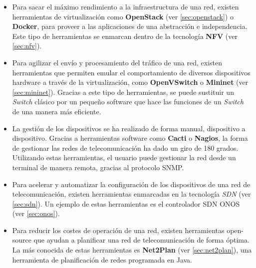 \begin{itemize}
	\item Para sacar el máximo rendimiento a la infraestructura de una red, existen herramientas de virtualización como \textbf{OpenStack} (ver \ref{sec:openstack}) o \textbf{Docker}, para proveer a las aplicaciones de una abstracción e independencia. Este tipo de herramientas se enmarcan dentro de la tecnología \textbf{\ac{NFV}} (ver \ref{sec:nfv}).
	
	\item Para agilizar el envío y procesamiento del tráfico de una red, existen herramientas que permiten emular el comportamiento de diversos dispositivos hardware a través de la virtualización, como \textbf{OpenVSwitch} o \textbf{Mininet} (ver \ref{sec:mininet}). Gracias a este tipo de herramientas, se puede sustituir un \textit{Switch} clásico por un pequeño software que hace las funciones de un \textit{Switch} de una manera más eficiente.
	
	\item La gestión de los dispositivos se ha realizado de forma manual, dispositivo a dispositivo. Gracias a herramientas software como \textbf{Cacti} o \textbf{Nagios}, la forma de gestionar las redes de telecomunicación ha dado un giro de 180 grados. Utilizando estas herramientas, el usuario puede gestionar la red desde un terminal de manera remota, gracias al protocolo \ac{SNMP}.
	
	\item Para acelerar y automatizar la configuración de los dispositivos de una red de telecomunicación, existen herramientas enmarcadas en la tecnología \textit{\ac{SDN}} (ver \ref{sec:sdn}). Un ejemplo de estas herramientas es el controlador \ac{SDN} \ac{ONOS} (ver \ref{sec:onos}).
	
	\item Para reducir los costes de operación de una red, existen herramientas open-source que ayudan a planificar una red de telecomunicación de forma óptima. La más conocida de estas herramientas es \textbf{Net2Plan} (ver \ref{sec:net2plan}), una herramienta de planificación de redes programada en Java.
\end{itemize}



\cleardoublepage